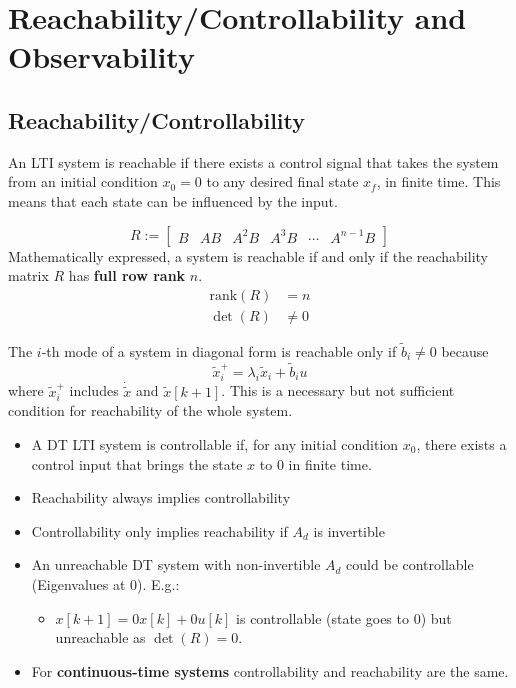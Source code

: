 \section{Reachability/Controllability and Observability}

\subsection{Reachability/Controllability}

An LTI system is reachable if there exists a control signal that takes the system from an initial condition $x_0 = 0$ to any desired final state $x_f$, in finite time. This means that each state can be influenced by the input.

\begin{equation*}
    R:= \begin{bmatrix}
        B & AB & A^2B & A^3B & \cdots & A^{n-1}B
    \end{bmatrix}
\end{equation*}
Mathematically expressed, a system is reachable if and only if the reachability matrix $R$ has \textbf{full row rank} $n$.
\begin{align*}
    \text{rank}(R) & = n    \\
    \det(R)        & \neq 0
\end{align*}


The $i$-th mode of a system in diagonal form is reachable only if $\tilde{b}_i \neq 0$ because
\begin{equation*}
    \tilde{x}_i^+ =\lambda_i\tilde{x}_i+\tilde{b}_i u
\end{equation*}
where $\tilde{x}_i^+$ includes $\dot{\tilde{x}}$ and $\tilde{x}[k+1]$. This is a necessary but not sufficient condition for reachability of the whole system.


\begin{itemize}
    \item A DT LTI system is controllable if, for any initial condition $x_0$, there exists a control input that brings the state $x$ to $0$ in finite time.
    \item Reachability always implies controllability
    \item Controllability only implies reachability if $A_d$ is invertible
    \item An unreachable DT system with non-invertible $A_d$ could be controllable (Eigenvalues at 0). E.g.:
          \begin{itemize}
              \item $x[k+1] = 0x[k] + 0u[k]$ is controllable (state goes to $0$) but unreachable as $\det(R)=0$.
          \end{itemize}
    \item For \textbf{continuous-time systems} controllability and reachability are the same.
\end{itemize}

